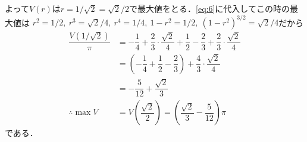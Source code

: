 \documentclass[../../main.tex]{subfiles}
\begin{document}
よって$V(r)$は$r=1/\sqrt{2}=\sqrt{2}/2$で最大値をとる．\cref{eq:6}に代入してこの時の最大値は
$r^2=1/2,\ r^3=\sqrt{2}/4,\ r^4=1/4,\ 1-r^2=1/2,\ (1-r^2)^{3/2}=\sqrt{2}/4$だから
\begin{align}
  \dfrac{V(1/\sqrt{2})}{\pi}
  &=-\dfrac{1}{4}+\dfrac{2}{3}\cdot\dfrac{\sqrt{2}}{4}+\dfrac{1}{2}-\dfrac{2}{3}+\dfrac{2}{3}\cdot\dfrac{\sqrt{2}}{4} \\
  &=\left(-\dfrac{1}{4}+\dfrac{1}{2}-\dfrac{2}{3}\right)+\dfrac{4}{3}\cdot\dfrac{\sqrt{2}}{4} \\
  &=-\dfrac{5}{12}+\dfrac{\sqrt{2}}{3} \\
  \therefore
  \max V&= V\left(\dfrac{\sqrt{2}}{2}\right) = \left(\dfrac{\sqrt{2}}{3}-\dfrac{5}{12}\right)\pi
\end{align}
である．
\end{document}

